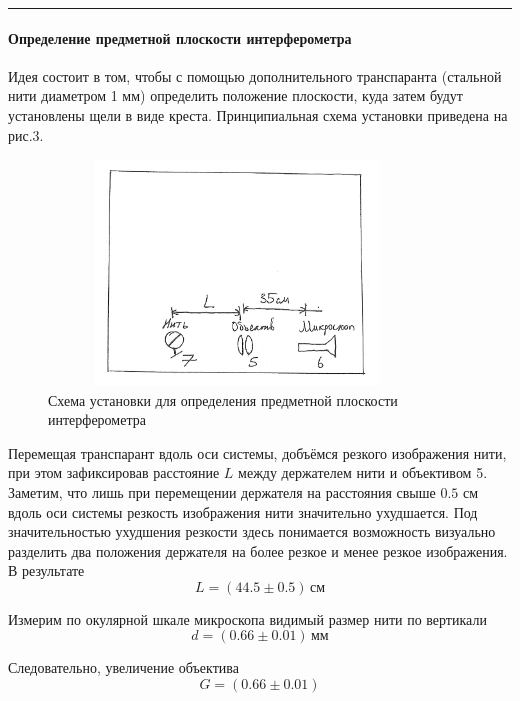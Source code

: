 \documentclass[12pt]{article}
\begin{document}
\noindent\rule{\textwidth}{1pt}

\newpage
\paragraph{Определение предметной плоскости интерферометра}
\par
	Идея состоит в том, чтобы с помощью дополнительного транспаранта (стальной нити диаметром 1 мм) определить положение плоскости, куда затем будут установлены щели в виде креста. Принципиальная схема установки приведена на рис.3.
\begin{figure}[h!]
	\centering
	\includegraphics[width = 10cm, height = 6cm]{image2.png}
	\caption{Схема установки для определения предметной плоскости интерферометра}
\end{figure}
\par
	Перемещая транспарант вдоль оси системы, добъёмся резкого изображения нити, при этом зафиксировав расстояние $L$ между держателем нити и объективом 5. Заметим, что лишь при перемещении держателя на расстояния свыше $0.5$ см вдоль оси системы резкость изображения нити значительно ухудшается. Под значительностью ухудшения резкости здесь понимается возможность визуально разделить два положения держателя на более резкое и менее резкое изображения. В результате
\[
	L = \left(44.5 \pm 0.5 \right) \, \text{см}
\]
\par
	Измерим по окулярной шкале микроскопа видимый размер нити по вертикали
\[
	d = \left(0.66 \pm 0.01\right) \, \text{мм}
\]
\par
	Следовательно, увеличение объектива
\[
	G = \left(0.66 \pm 0.01 \right)
\]
\newpage
\end{document}
